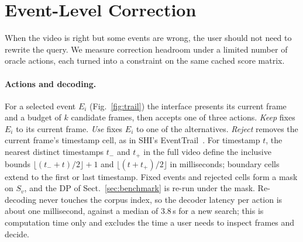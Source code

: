 \section{Event-Level Correction}
\label{sec:correction}

When the video is right but some events are wrong, the user should not need to rewrite the query.
We measure correction headroom under a limited number of oracle actions, each turned into a constraint on the same cached score matrix.



\paragraph{Actions and decoding.}
For a selected event $E_i$ (Fig.~\ref{fig:trail}) the interface presents its current frame and a budget of $k$ candidate frames, then accepts one of three actions.
\emph{Keep} fixes $E_i$ to its current frame.
\emph{Use} fixes $E_i$ to one of the alternatives.
\emph{Reject} removes the current frame's timestamp cell, as in SHI's EventTrail~\cite{nguyen2027shi}.
For timestamp $t$, the nearest distinct timestamps $t_-$ and $t_+$ in the full video define the inclusive bounds $\lfloor(t_-+t)/2\rfloor+1$ and $\lfloor(t+t_+)/2\rfloor$ in milliseconds; boundary cells extend to the first or last timestamp.
Fixed events and rejected cells form a mask on $S_v$, and the DP of Sect.~\ref{sec:benchmark} is re-run under the mask.
Re-decoding never touches the corpus index, so the decoder latency per action is about one millisecond, against a median of 3.8\,s for a new search; this is computation time only and excludes the time a user needs to inspect frames and decide.

